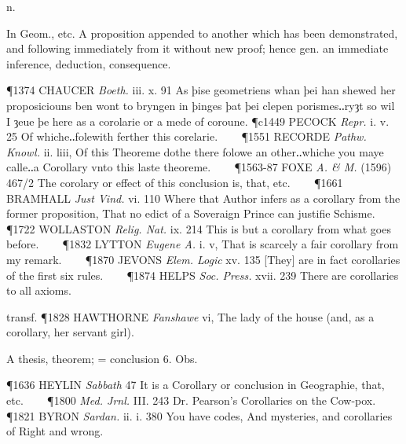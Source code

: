 \begin{description}[wide, labelwidth=!, labelindent=0pt]
 n.

\noindent {}

\vspace{-0.3cm}

\begin{myenumerate}

 In Geom., etc. A proposition appended to another which has been demonstrated, and following immediately from it without new proof; hence gen. an immediate inference, deduction, consequence.

\P 1374 CHAUCER  \textit{Boeth.} iii. x. 91 As þise geometriens whan þei han shewed her proposiciouns ben wont to bryngen in þinges þat þei clepen porismes‥ryȝt so wil I ȝeue þe here as a corolarie or a mede of coroune.
\P c1449 PECOCK  \textit{Repr.} i. v. 25 Of whiche‥folewith ferther this corelarie.    
\P 1551 RECORDE  \textit{Pathw. Knowl.} ii. liii, Of this Theoreme dothe there folowe an other‥whiche you maye calle‥a Corollary vnto this laste theoreme.    
\P 1563-87 FOXE  \textit{A. \& M.} (1596) 467/2 The corolary or effect of this conclusion is, that, etc.    
\P 1661 BRAMHALL  \textit{Just Vind.} vi. 110 Where that Author infers as a corollary from the former proposition, That no edict of a Soveraign Prince can justifie Schisme.    
\P 1722 WOLLASTON  \textit{Relig. Nat.} ix. 214 This is but a corollary from what goes before.    
\P 1832 LYTTON  \textit{Eugene A.} i. v, That is scarcely a fair corollary from my remark.    
\P 1870 JEVONS  \textit{Elem. Logic} xv. 135 [They] are in fact corollaries of the first six rules.    
\P 1874 HELPS  \textit{Soc. Press.} xvii. 239 There are corollaries to all axioms.

transf. \P 1828 HAWTHORNE  \textit{Fanshawe} vi, The lady of the house (and, as a corollary, her servant girl).

 A thesis, theorem; = conclusion 6. Obs.

\P 1636 HEYLIN  \textit{Sabbath} 47 It is a Corollary or conclusion in Geographie, that, etc.    
\P 1800  \textit{Med. Jrnl.} III. 243 Dr. Pearson's Corollaries on the Cow-pox.    
\P 1821 BYRON  \textit{Sardan.} ii. i. 380 You have codes, And mysteries, and corollaries of Right and wrong.


\end{myenumerate}
\end{description}
